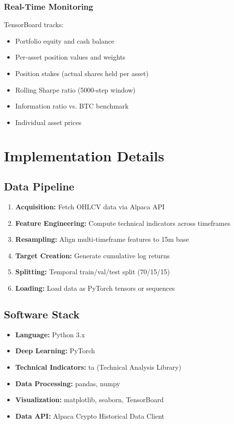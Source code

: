 \documentclass[12pt,a4paper]{article}
\begin{document}
\subsubsection{Real-Time Monitoring}
TensorBoard tracks:
\begin{itemize}
    \item Portfolio equity and cash balance
    \item Per-asset position values and weights
    \item Position stakes (actual shares held per asset)
    \item Rolling Sharpe ratio (5000-step window)
    \item Information ratio vs. BTC benchmark
    \item Individual asset prices
\end{itemize}

\section{Implementation Details}

\subsection{Data Pipeline}
\begin{enumerate}
    \item \textbf{Acquisition:} Fetch OHLCV data via Alpaca API
    \item \textbf{Feature Engineering:} Compute technical indicators across timeframes
    \item \textbf{Resampling:} Align multi-timeframe features to 15m base
    \item \textbf{Target Creation:} Generate cumulative log returns
    \item \textbf{Splitting:} Temporal train/val/test split (70/15/15)
    \item \textbf{Loading:} Load data as PyTorch tensors or sequences
\end{enumerate}

\subsection{Software Stack}
\begin{itemize}
    \item \textbf{Language:} Python 3.x
    \item \textbf{Deep Learning:} PyTorch
    \item \textbf{Technical Indicators:} ta (Technical Analysis Library)
    \item \textbf{Data Processing:} pandas, numpy
    \item \textbf{Visualization:} matplotlib, seaborn, TensorBoard
    \item \textbf{Data API:} Alpaca Crypto Historical Data Client
\end{itemize}
\end{document}
